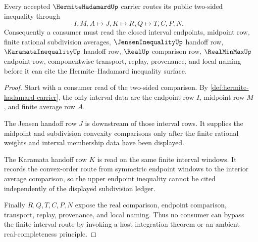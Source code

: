 \begin{theorem}
\label{thm:hermite-hadamard-jensen-interval-route}
Every accepted $\HermiteHadamardUp$ carrier routes its public two-sided inequality through
$$
I,M,A \longmapsto J,K \longmapsto R,Q \longmapsto T,C,P,N .
$$
Consequently a consumer must read the closed interval endpoints, midpoint row, finite rational subdivision averages, $\JensenInequalityUp$ handoff row, $\KaramataInequalityUp$ handoff row, $\RealUp$ comparison row, $\RealMinMaxUp$ endpoint row, componentwise transport, replay, provenance, and local naming before it can cite the Hermite--Hadamard inequality surface.
\end{theorem}
\begin{proof}
Start with a consumer read of the two-sided comparison. By \autoref{def:hermite-hadamard-carrier}, the only interval data are the endpoint row $I$, midpoint row $M$, and finite average row $A$.

The Jensen handoff row $J$ is downstream of those interval rows. It supplies the midpoint and subdivision convexity comparisons only after the finite rational weights and interval membership data have been displayed.

The Karamata handoff row $K$ is read on the same finite interval windows. It records the convex-order route from symmetric endpoint windows to the interior average comparison, so the upper endpoint inequality cannot be cited independently of the displayed subdivision ledger.

Finally $R,Q,T,C,P,N$ expose the real comparison, endpoint comparison, transport, replay, provenance, and local naming. Thus no consumer can bypass the finite interval route by invoking a host integration theorem or an ambient real-completeness principle.
\end{proof}




